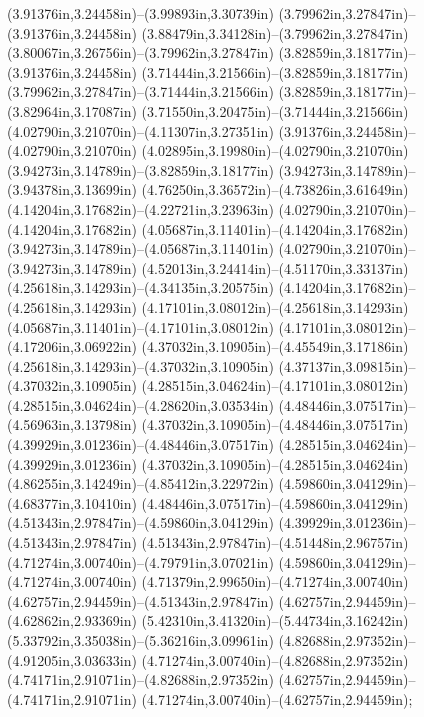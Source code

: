 (3.91376in,3.24458in)--(3.99893in,3.30739in) (3.79962in,3.27847in)--(3.91376in,3.24458in) (3.88479in,3.34128in)--(3.79962in,3.27847in) (3.80067in,3.26756in)--(3.79962in,3.27847in) (3.82859in,3.18177in)--(3.91376in,3.24458in) (3.71444in,3.21566in)--(3.82859in,3.18177in) (3.79962in,3.27847in)--(3.71444in,3.21566in) (3.82859in,3.18177in)--(3.82964in,3.17087in) (3.71550in,3.20475in)--(3.71444in,3.21566in) (4.02790in,3.21070in)--(4.11307in,3.27351in) (3.91376in,3.24458in)--(4.02790in,3.21070in) (4.02895in,3.19980in)--(4.02790in,3.21070in) (3.94273in,3.14789in)--(3.82859in,3.18177in) (3.94273in,3.14789in)--(3.94378in,3.13699in) (4.76250in,3.36572in)--(4.73826in,3.61649in) (4.14204in,3.17682in)--(4.22721in,3.23963in) (4.02790in,3.21070in)--(4.14204in,3.17682in) (4.05687in,3.11401in)--(4.14204in,3.17682in) (3.94273in,3.14789in)--(4.05687in,3.11401in) (4.02790in,3.21070in)--(3.94273in,3.14789in) (4.52013in,3.24414in)--(4.51170in,3.33137in) (4.25618in,3.14293in)--(4.34135in,3.20575in) (4.14204in,3.17682in)--(4.25618in,3.14293in) (4.17101in,3.08012in)--(4.25618in,3.14293in) (4.05687in,3.11401in)--(4.17101in,3.08012in) (4.17101in,3.08012in)--(4.17206in,3.06922in) (4.37032in,3.10905in)--(4.45549in,3.17186in) (4.25618in,3.14293in)--(4.37032in,3.10905in) (4.37137in,3.09815in)--(4.37032in,3.10905in) (4.28515in,3.04624in)--(4.17101in,3.08012in) (4.28515in,3.04624in)--(4.28620in,3.03534in) (4.48446in,3.07517in)--(4.56963in,3.13798in) (4.37032in,3.10905in)--(4.48446in,3.07517in) (4.39929in,3.01236in)--(4.48446in,3.07517in) (4.28515in,3.04624in)--(4.39929in,3.01236in) (4.37032in,3.10905in)--(4.28515in,3.04624in) (4.86255in,3.14249in)--(4.85412in,3.22972in) (4.59860in,3.04129in)--(4.68377in,3.10410in) (4.48446in,3.07517in)--(4.59860in,3.04129in) (4.51343in,2.97847in)--(4.59860in,3.04129in) (4.39929in,3.01236in)--(4.51343in,2.97847in) (4.51343in,2.97847in)--(4.51448in,2.96757in) (4.71274in,3.00740in)--(4.79791in,3.07021in) (4.59860in,3.04129in)--(4.71274in,3.00740in) (4.71379in,2.99650in)--(4.71274in,3.00740in) (4.62757in,2.94459in)--(4.51343in,2.97847in) (4.62757in,2.94459in)--(4.62862in,2.93369in) (5.42310in,3.41320in)--(5.44734in,3.16242in) (5.33792in,3.35038in)--(5.36216in,3.09961in) (4.82688in,2.97352in)--(4.91205in,3.03633in) (4.71274in,3.00740in)--(4.82688in,2.97352in) (4.74171in,2.91071in)--(4.82688in,2.97352in) (4.62757in,2.94459in)--(4.74171in,2.91071in) (4.71274in,3.00740in)--(4.62757in,2.94459in);
